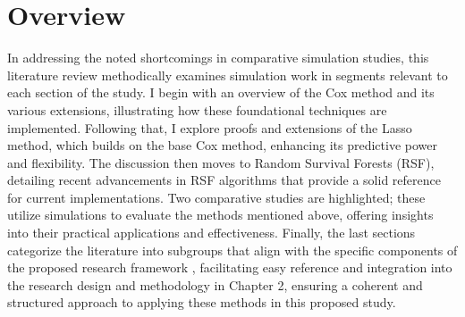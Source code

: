 \section{Overview}
\noindent
In addressing the noted shortcomings in comparative simulation studies, this literature review methodically examines simulation work in segments relevant to each section of the study. I begin with an overview of the Cox method and its various extensions, illustrating how these foundational techniques are implemented. Following that, I explore proofs and extensions of the Lasso method, which builds on the base Cox method, enhancing its predictive power and flexibility. The discussion then moves to Random Survival Forests (RSF), detailing recent advancements in RSF algorithms that provide a solid reference for current implementations. Two comparative studies are highlighted; these utilize simulations to evaluate the methods mentioned above, offering insights into their practical applications and effectiveness. Finally, the last sections categorize the literature into subgroups that align with the specific components of the proposed research framework \parencite{pawel_pitfalls_2024} \parencite{morris_using_2019}, facilitating easy reference and integration into the research design and methodology in Chapter 2, ensuring a coherent and structured approach to applying these methods in this proposed study.

